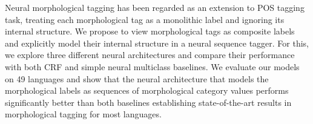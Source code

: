 Neural morphological tagging has been regarded as an extension to POS tagging task, treating each morphological tag as a monolithic label and ignoring its internal structure. We propose to view morphological tags as composite labels and explicitly model their internal structure in a neural sequence tagger. For this, we explore three different neural architectures and compare their performance with both CRF and simple neural multiclass baselines. We evaluate our models on 49 languages and show that the neural architecture that models the morphological labels as sequences of morphological category values performs significantly better than both baselines establishing state-of-the-art results in morphological tagging for most languages.
